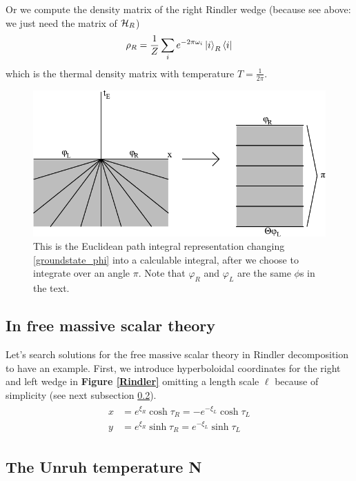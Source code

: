 	Or we compute the density matrix of the right Rindler wedge (because see above: we just need the matrix of $\mathcal{H}_R$)
	\begin{align}
		\rho_R= \frac{1}{Z} \sum_i e^{-2\pi\omega_i} \ket{i}_R \bra{i}
	\end{align}
	which is the thermal density matrix with temperature $T=\frac{1}{2\pi}$. 
	\begin{figure}[tbp]
		\begin{center}
			\includegraphics[scale=1]{eucpath}
			\caption{This is the Euclidean path integral representation changing \eqref{groundstate_phi} into a calculable integral, after we choose to integrate over an angle $\pi$. Note that $\varphi_R$ and $\varphi_L$ are the same $\phi$s in the text.}\label{eucpath}
		\end{center}
	\end{figure}
\subsection{In free massive scalar theory}	
	Let's search solutions for the free massive scalar theory in Rindler decomposition to have an example. First, we introduce hyperboloidal coordinates for the right and left wedge in \textbf{Figure \ref{Rindler}} omitting a length scale $\ell$ because of simplicity (see next subsection \ref{Unruh}).
	\begin{align}
		\begin{split}
		x &= e^{\xi_R} \cosh \tau_R = -e^{-\xi_L} \cosh \tau_L \\
		y &= e^{\xi_R} \sinh \tau_R = e^{-\xi_L} \sinh \tau_L
		\end{split}
	\end{align}
\subsection{The Unruh temperature N} \label{Unruh}
	
